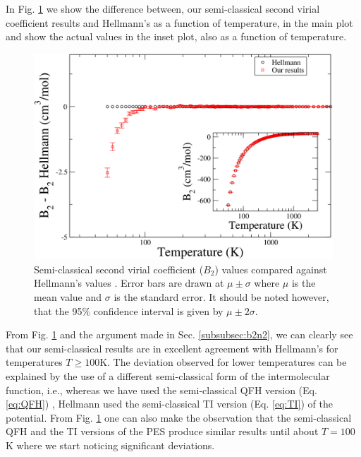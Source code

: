         In Fig. \ref{fig:B2SCN2} we show the difference between, our semi-classical second virial coefficient results and Hellmann's as a function of temperature, in the main plot and show the actual values in the inset plot, also as a function of temperature.
        \begin{figure}[!htbp]
            \centering
            \includegraphics[scale=0.20,keepaspectratio]{Chapter-5/Figures/B2SC9sResultsAll.png}
            \caption{Semi-classical second virial coefficient ($B_2$) values compared against Hellmann's values \cite{Hellmann2013}. Error bars are drawn at $\mu \pm \sigma$ where $\mu$ is the mean value and $\sigma$ is the standard error. It should be noted however, that the 95\% confidence interval is given by $\mu \pm 2\sigma$.}
            \label{fig:B2SCN2}
        \end{figure}
        From Fig. \ref{fig:B2SCN2} and the argument made in Sec. \ref{subsubsec:b2n2}, we can clearly see that our semi-classical results are in excellent agreement with Hellmann's for temperatures $T \ge 100$K. The deviation observed for lower temperatures can be explained by the use of a different semi-classical form of the intermolecular function, i.e., whereas we have used the semi-classical QFH version (Eq. \eqref{eq:QFH}) , Hellmann used the semi-classical TI version (Eq. \eqref{eq:TI}) of the \abinitio{} potential. From Fig. \ref{fig:B2SCN2} one can also make the observation that the semi-classical QFH and the TI versions of the \abinitio{} PES produce similar results until about $T = 100$K where we start noticing significant deviations.

